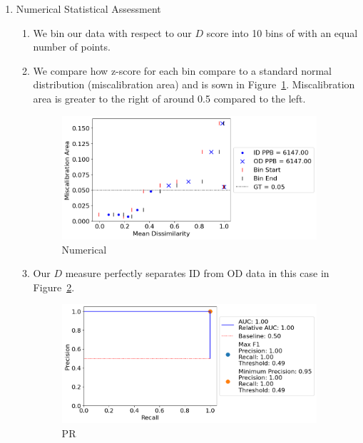 \begin{enumerate}
    \item Numerical Statistical Assessment

    \begin{enumerate}
        \item We bin our data with respect to our $D$ score into 10 bins of with an equal number of points.

        \item We compare how z-score for each bin compare to a standard normal distribution (miscalibration area) and is sown in Figure~\ref{fluence_stat}. Miscalibration area is greater to the right of around 0.5 compared to the left.

        \begin{figure}[H]
        \centering
        \includegraphics[width=0.95\textwidth]{figures/fluence_stat.png}
        \caption{Numerical}
        \label{fluence_stat}
        \end{figure}

        \item Our $D$ measure perfectly separates ID from OD data in this case in Figure~\ref{fluence_stat_pr}.

        \begin{figure}[H]
        \centering
        \includegraphics[width=0.95\textwidth]{figures/fluence_stat_pr.png}
        \caption{PR}
        \label{fluence_stat_pr}
        \end{figure}
        
    \end{enumerate}

\end{enumerate}

